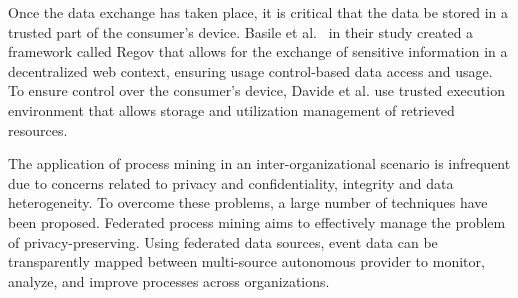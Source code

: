 Once the data exchange has taken place, it is critical that the data be stored in a trusted part of the consumer's device. Basile et al.~\cite{Basile_Blockchain_based_resource_governance_for_decentralized_web_environments} in their study created a framework called Regov that allows for the exchange of sensitive information in a decentralized web context, ensuring usage control-based data access and usage. To ensure control over the consumer's device, Davide et al. use trusted execution environment that allows storage and utilization management of retrieved resources. 

The application of process mining in an inter-organizational scenario is infrequent due to concerns related to privacy and confidentiality, integrity and data heterogeneity. To overcome these problems, a large number of techniques have been proposed. Federated process mining \cite{van2021federated} aims to effectively manage the problem of privacy-preserving. Using federated data sources, event data can be transparently mapped between multi-source autonomous provider to monitor, analyze, and improve processes across organizations.

